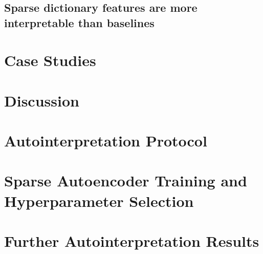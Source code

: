 \documentclass{article}
\begin{document}
\subsection{Sparse dictionary features are more interpretable than baselines}
\label{subsection:interpretability_baselines}

\section{Case Studies}

\label{section:case_studies}




\section{Discussion}



% 





\appendix

\section{Autointerpretation Protocol}
\label{appendix:autointerp_protocol}


\section{Sparse Autoencoder Training and Hyperparameter Selection}
\label{appendix:hparam_selection}


\section{Further Autointerpretation Results}
\label{appendix:full_autointerp}

\end{document}

